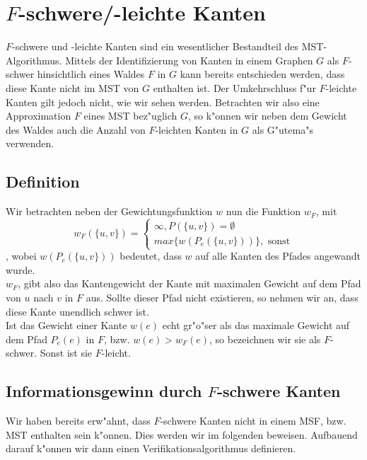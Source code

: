 \section{$F$-schwere/-leichte Kanten}
\label{sec:fEdg}

$F$-schwere und -leichte Kanten sind ein wesentlicher Bestandteil des 
    MST-Algorithmus. Mittels der Identifizierung von Kanten in einem Graphen $G$
    als $F$-schwer hinsichtlich eines Waldes $F$ in $G$ kann
    bereits entschieden werden, dass diese Kante nicht im MST von $G$ enthalten
    ist. Der Umkehrschluss f"ur $F$-leichte Kanten gilt jedoch nicht, wie wir
    sehen werden.
    Betrachten wir also eine Approximation $F$ eines MST bez"uglich $G$, so k"onnen
    wir neben dem Gewicht des Waldes auch die Anzahl von $F$-leichten Kanten in $G$ als
    G"utema"s verwenden.\\

\subsection{Definition}

Wir betrachten neben der Gewichtungsfunktion $w$ nun die Funktion $w_F$, mit
    $$
    w_F(\{u,v\}) =  \begin{cases}
                        \infty, P(\{u,v\}) = \emptyset\\
                        max\{w(P_e(\{u,v\}))\}, \text{ sonst}
                    \end{cases}
    $$
, wobei $w(P_e(\{u,v\}))$ bedeutet, dass $w$ auf alle Kanten des Pfades angewandt
    wurde.\\
$w_F$, gibt also das Kantengewicht der Kante mit maximalen Gewicht auf dem
    Pfad von $u$ nach $v$ in $F$ aus. Sollte dieser Pfad nicht existieren, so
    nehmen wir an, dass diese Kante unendlich schwer ist.\\
Ist das Gewicht einer Kante $w(e)$ echt gr"o"ser als das maximale Gewicht auf dem 
    Pfad $P_e(e)$ in $F$, bzw. $w(e) > w_F(e)$, 
    so bezeichnen wir sie als $F$-schwer.
    Sonst ist sie $F$-leicht.

\subsection{Informationsgewinn durch $F$-schwere Kanten}

Wir haben bereits erw"ahnt, dass $F$-schwere Kanten nicht in einem MSF, bzw. MST
    enthalten sein k"onnen.
    Dies werden wir im folgenden beweisen.
    Aufbauend darauf k"onnen wir dann einen Verifikationsalgorithmus definieren.\\

